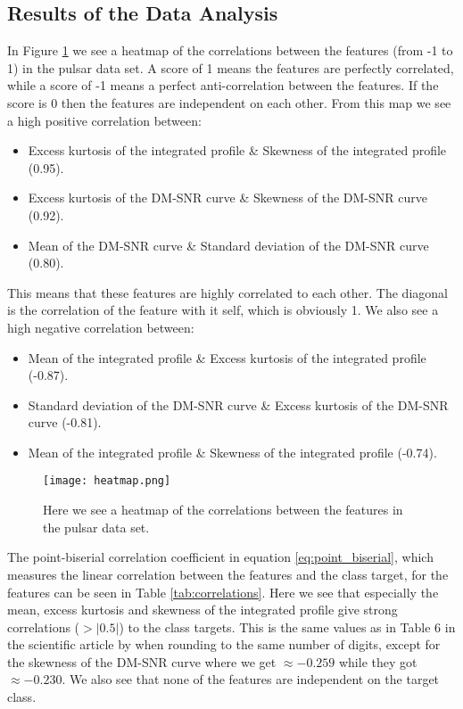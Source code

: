 \documentclass[12pt,a4paper,english]{article}
\begin{document}
\subsection{Results of the Data Analysis}
\label{subsect:Res_analysis}
In Figure \ref{fig:heatmap} we see a heatmap of the correlations between the features (from -1 to 1) in the pulsar data set. A score of 1 means the features are perfectly correlated, while a score of -1 means a perfect anti-correlation between the features. If the score is 0 then the features are independent on each other. From this map we see a high positive correlation between:
\begin{itemize}
	\item Excess kurtosis of the integrated profile \& Skewness of the integrated profile (0.95).
	\item Excess kurtosis of the DM-SNR curve \& Skewness of the DM-SNR curve (0.92).
	\item Mean of the DM-SNR curve \& Standard deviation of the DM-SNR curve (0.80).
\end{itemize}
This means that these features are highly correlated to each other. The diagonal is the correlation of the feature with it self, which is obviously 1. We also see a high negative correlation between:
\begin{itemize}
	\item Mean of the integrated profile \& Excess kurtosis of the integrated profile (-0.87).
	\item Standard deviation of the DM-SNR curve \& Excess kurtosis of the DM-SNR curve (-0.81).
	\item Mean of the integrated profile \& Skewness of the integrated profile (-0.74).
\end{itemize}

\begin{figure}[htbp!]
	\centering\texttt{[image: heatmap.png]}
	\caption{Here we see a heatmap of the correlations between the features in the pulsar data set.\label{fig:heatmap}}
\end{figure} 

The point-biserial correlation coefficient in equation \ref{eq:point_biserial}, which measures the linear correlation between the features and the class target, for the features can be seen in Table \ref{tab:correlations}. Here we see that especially the mean, excess kurtosis and skewness of the integrated profile give strong correlations ($>|0.5|$) to the class targets. This is the same values as in Table 6 in the scientific article by \citet{pulsar_art} when rounding to the same number of digits, except for the skewness of the DM-SNR curve where we get $\approx-0.259$ while they got $\approx-0.230$. We also see that none of the features are independent on the target class.
\end{document}
